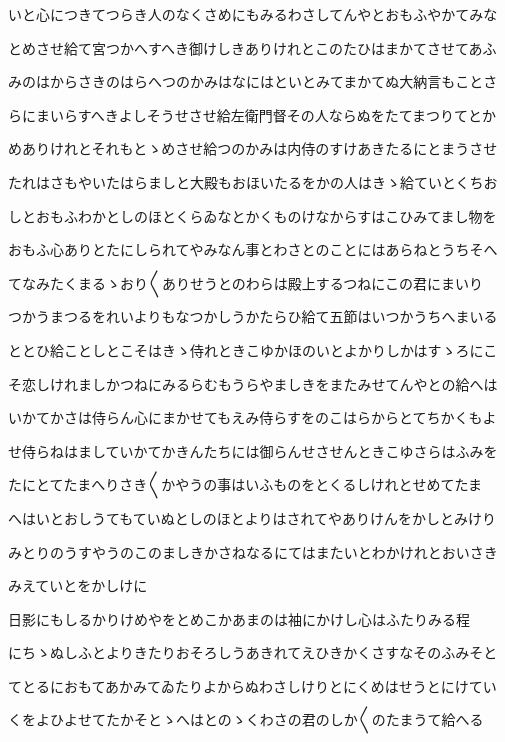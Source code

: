 \documentclass[a4paper,11pt,landscape]{ltjtarticle}
\begin{document}
いと心につきてつらき人のなくさめにもみるわさしてんやとおもふやかてみな
\par\medskip
とめさせ給て宮つかへすへき御けしきありけれとこのたひはまかてさせてあふ
\par\medskip
みのはからさきのはらへつのかみはなにはといとみてまかてぬ大納言もことさ
\par\medskip
らにまいらすへきよしそうせさせ給左衛門督その人ならぬをたてまつりてとか
\par\medskip
めありけれとそれもとゝめさせ給つのかみは内侍のすけあきたるにとまうさせ
\par\medskip
たれはさもやいたはらましと大殿もおほいたるをかの人はきゝ給ていとくちお
\par\medskip
しとおもふわかとしのほとくらゐなとかくものけなからすはこひみてまし物を
\par\medskip
おもふ心ありとたにしられてやみなん事とわさとのことにはあらねとうちそへ
\par\medskip
てなみたくまるゝおり〱ありせうとのわらは殿上するつねにこの君にまいり
\par\medskip
つかうまつるをれいよりもなつかしうかたらひ給て五節はいつかうちへまいる
\par\medskip
ととひ給ことしとこそはきゝ侍れときこゆかほのいとよかりしかはすゝろにこ
\par\medskip
そ恋しけれましかつねにみるらむもうらやましきをまたみせてんやとの給へは
\par\medskip
いかてかさは侍らん心にまかせてもえみ侍らすをのこはらからとてちかくもよ
\par\medskip
せ侍らねはましていかてかきんたちには御らんせさせんときこゆさらはふみを
\par\medskip
たにとてたまへりさき〱かやうの事はいふものをとくるしけれとせめてたま
\par\medskip
へはいとおしうてもていぬとしのほとよりはされてやありけんをかしとみけり
\par\medskip
みとりのうすやうのこのましきかさねなるにてはまたいとわかけれとおいさき
\par\medskip
みえていとをかしけに
\par\medskip
日影にもしるかりけめやをとめこかあまのは袖にかけし心はふたりみる程
\par\medskip
にちゝぬしふとよりきたりおそろしうあきれてえひきかくさすなそのふみそと
\par\medskip
てとるにおもてあかみてゐたりよからぬわさしけりとにくめはせうとにけてい
\par\medskip
くをよひよせてたかそとゝへはとのゝくわさの君のしか〱のたまうて給へる
\end{document}
